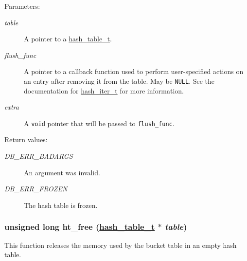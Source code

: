 \begin{Desc}
\item[Parameters:]
\begin{description}
\item[{\em table}]A pointer to a \hyperlink{group__dbprim__hash_a0}{hash\_\-table\_\-t}. \item[{\em flush\_\-func}]A pointer to a callback function used to perform user-specified actions on an entry after removing it from the table. May be {\tt NULL}. See the documentation for \hyperlink{group__dbprim__hash_a2}{hash\_\-iter\_\-t} for more information. \item[{\em extra}]A {\tt void} pointer that will be passed to {\tt flush\_\-func}.\end{description}
\end{Desc}
\begin{Desc}
\item[Return values:]
\begin{description}
\item[{\em DB\_\-ERR\_\-BADARGS}]An argument was invalid. \item[{\em DB\_\-ERR\_\-FROZEN}]The hash table is frozen. \end{description}
\end{Desc}
\hypertarget{group__dbprim__hash_a14}{
\subsubsection[ht\_\-free]{\setlength{\rightskip}{0pt plus 5cm}unsigned long ht\_\-free (\hyperlink{dbprim_8h_a0}{hash\_\-table\_\-t} $\ast$ {\em table})}}
\label{group__dbprim__hash_a14}


This function releases the memory used by the bucket table in an empty hash table.

